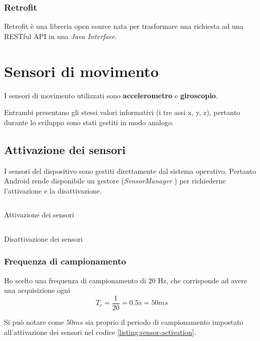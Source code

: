 \subsubsection{Retrofit}
Retrofit \cite{retrofit} è una libreria open source nata per trasformare una richiesta ad una RESTful API 
in una \textit{Java Interface}.


\newpage
\section{Sensori di movimento}
I sensori di movimento utilizzati sono \textbf{accelerometro} e \textbf{giroscopio}.

Entrambi presentano gli stessi valori informativi (i tre assi x, y, z), pertanto durante lo sviluppo sono stati gestiti in modo analogo.

\subsection{Attivazione dei sensori}
I sensori del dispositivo sono gestiti direttamente dal sistema operativo. Pertanto Android rende disponibile 
un gestore (\textit{SensorManager} \cite{sensor_manager}) per richiederne l'attivazione e la disattivazione.

\begin{listing}[H] 
    \inputminted[frame=single,framesep=10pt]{java}{assets/snippets/app/sensors/start_sensors.java}
    \caption{Attivazione dei sensori}
    \label{listing:sensor-activation}
\end{listing}
\begin{listing}[H] 
    \inputminted[frame=single,framesep=10pt]{java}{assets/snippets/app/sensors/stop_sensors.java}
    \caption{Disattivazione dei sensori}
    \label{listing:sensor-deactivation}
\end{listing}

\vfill
\subsubsection{Frequenza di campionamento}
\label{paragraph:sampling_rate}
Ho scelto una frequenza di campionamento di $20$ Hz, che corrisponde ad avere una acquisizione 
ogni 
$$T_c = \frac{1}{20} = 0.5 s = 50ms $$

\vspace{5mm} %
\noindent Si può notare come $50ms$ sia proprio il periodo di campionamento impostato 
all'attivazione dei sensori nel codice \ref{listing:sensor-activation}.


